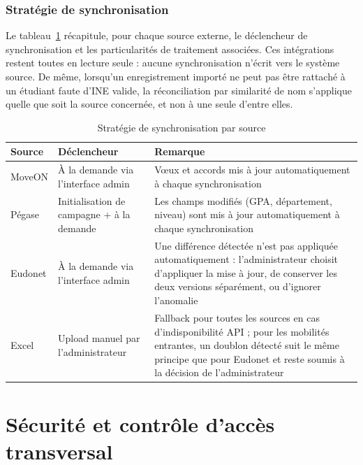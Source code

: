 \subsubsection{Stratégie de synchronisation}

Le tableau~\ref{tab:sync-strategy} récapitule, pour chaque source externe, le déclencheur de synchronisation et les particularités de traitement associées. Ces intégrations restent toutes en lecture seule : aucune synchronisation n'écrit vers le système source. De même, lorsqu'un enregistrement importé ne peut pas être rattaché à un étudiant faute d'INE valide, la réconciliation par similarité de nom s'applique quelle que soit la source concernée, et non à une seule d'entre elles.

\renewcommand{\arraystretch}{1.4}
\begin{table}[H]
\centering
\caption{Stratégie de synchronisation par source}
\label{tab:sync-strategy}
\footnotesize
\begin{tabular}{|p{2.5cm}|p{5cm}|p{5cm}|}
\hline
\rowcolor{gray!20}
\textbf{Source} & \textbf{Déclencheur} & \textbf{Remarque} \\
\hline
MoveON &
À la demande via l'interface admin &
Vœux et accords mis à jour automatiquement à chaque synchronisation \\
\hline
Pégase &
Initialisation de campagne + à la demande &
Les champs modifiés (GPA, département, niveau) sont mis à jour automatiquement à chaque synchronisation \\
\hline
Eudonet &
À la demande via l'interface admin &
Une différence détectée n'est pas appliquée automatiquement : l'administrateur choisit d'appliquer la mise à jour, de conserver les deux versions séparément, ou d'ignorer l'anomalie \\
\hline
Excel &
Upload manuel par l'administrateur &
Fallback pour toutes les sources en cas d'indisponibilité API ; pour les mobilités entrantes, un doublon détecté suit le même principe que pour Eudonet et reste soumis à la décision de l'administrateur \\
\hline
\end{tabular}
\end{table}

\section{Sécurité et contrôle d'accès transversal}


